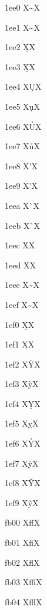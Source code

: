 \documentclass[11pt]{article}
\begin{document}
1ee0 X{\~{\OHORN}}X

1ee1 X{\~{\ohorn}}X

1ee2 X{\d{\OHORN}}X

1ee3 X{\d{\ohorn}}X

1ee4 X{\d{U}}X

1ee5 X{\d{u}}X

1ee6 X{\h{U}}X

1ee7 X{\h{u}}X

1ee8 X{\'{\UHORN}}X

1ee9 X{\'{\uhorn}}X

1eea X{\`{\UHORN}}X

1eeb X{\`{\uhorn}}X

1eec X{\h{\UHORN}}X

1eed X{\h{\uhorn}}X

1eee X{\~{\UHORN}}X

1eef X{\~{\uhorn}}X

1ef0 X{\d{\UHORN}}X

1ef1 X{\d{\uhorn}}X

1ef2 X{\`Y}X

1ef3 X{\`y}X

1ef4 X{\d{Y}}X

1ef5 X{\d{y}}X

1ef6 X{\h{Y}}X

1ef7 X{\h{y}}X

1ef8 X{\~Y}X

1ef9 X{\~y}X

fb00 X{ff}X

fb01 X{fi}X

fb02 X{fl}X

fb03 X{ffi}X

fb04 X{ffl}X
\end{document}
